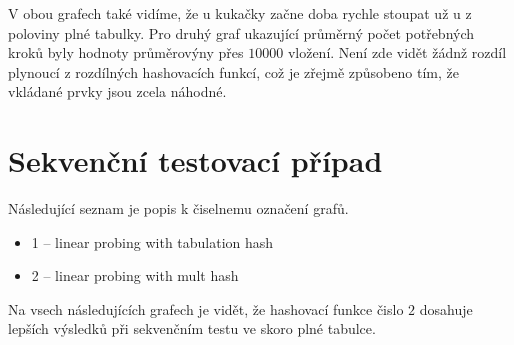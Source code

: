 \documentclass[12pt,a4paper]{report}
\begin{document}
V obou grafech také vidíme, že u kukačky začne doba rychle stoupat už u z poloviny plné tabulky.
Pro druhý graf ukazující průměrný počet potřebných kroků byly hodnoty průměrovýny přes $10000$ vložení.
Není zde vidět žádnž rozdíl plynoucí z rozdílných hashovacích funkcí, což je zřejmě způsobeno tím, 
že vkládané prvky jsou zcela náhodné.


\section{Sekvenční testovací případ}
Následující seznam je popis k čiselnemu označení grafů.
\begin{itemize}
\item 1 -- linear probing with tabulation hash
\item 2 -- linear probing with mult hash
\end{itemize}

Na vsech následujících grafech je vidět, že hashovací funkce čislo $2$ dosahuje 
lepších výsledků při sekvenčním testu ve skoro plné tabulce.
\end{document}
